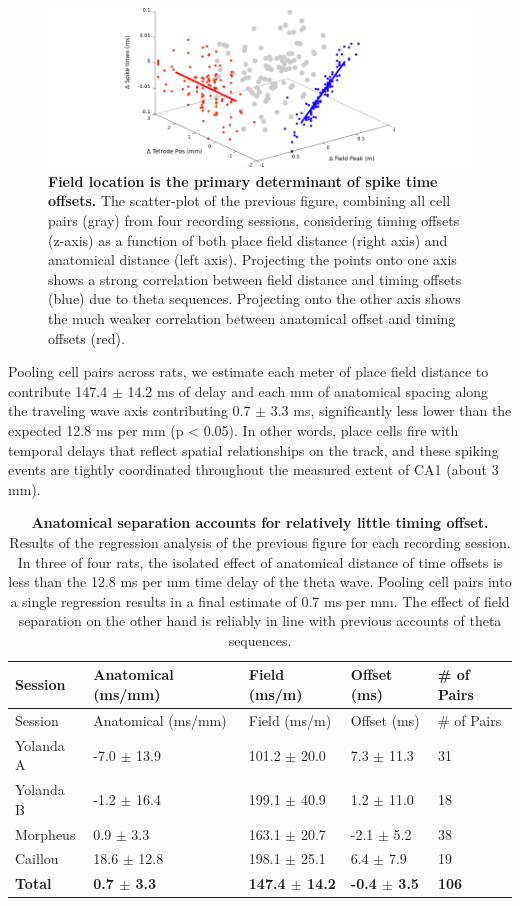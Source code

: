 \documentclass[]{article}
\begin{document}
\begin{figure}[htbp]
\centering
\includegraphics{./finalFigs/pairXcorrSummary.png}
\caption{\textbf{Field location is the primary determinant of spike time offsets.}
The scatter-plot of the previous figure, combining all cell pairs (gray)
from four recording sessions, considering timing offsets (z-axis) as a
function of both place field distance (right axis) and anatomical
distance (left axis). Projecting the points onto one axis shows a strong
correlation between field distance and timing offsets (blue) due to
theta sequences. Projecting onto the other axis shows the much weaker
correlation between anatomical offset and timing offsets (red).}
\end{figure}

Pooling cell pairs across rats, we estimate each meter of place field
distance to contribute 147.4 \(\pm\) 14.2 ms of delay and each mm of
anatomical spacing along the traveling wave axis contributing 0.7
\(\pm\) 3.3 ms, significantly less lower than the expected 12.8 ms per
mm (p \textless{} 0.05). In other words, place cells fire with temporal
delays that reflect spatial relationships on the track, and these
spiking events are tightly coordinated throughout the measured extent of
CA1 (about 3 mm).

\begin{longtable}[c]{@{}lllll@{}}
\caption{\textbf{Anatomical separation accounts for relatively little timing offset.}
Results of the regression analysis of the previous figure for each
recording session. In three of four rats, the isolated effect of
anatomical distance of time offsets is less than the 12.8 ms per mm time
delay of the theta wave. Pooling cell pairs into a single regression
results in a final estimate of 0.7 ms per mm. The effect of field
separation on the other hand is reliably in line with previous accounts
of theta sequences.}\tabularnewline
\toprule
Session & Anatomical (ms/mm) & Field (ms/m) & Offset (ms) & \# of
Pairs\tabularnewline
\midrule
\endfirsthead
\toprule
Session & Anatomical (ms/mm) & Field (ms/m) & Offset (ms) & \# of
Pairs\tabularnewline
\midrule
\endhead
Yolanda A & -7.0 \(\pm\) 13.9 & 101.2 \(\pm\) 20.0 & 7.3 \(\pm\) 11.3 &
31\tabularnewline
Yolanda B & -1.2 \(\pm\) 16.4 & 199.1 \(\pm\) 40.9 & 1.2 \(\pm\) 11.0 &
18\tabularnewline
Morpheus & 0.9 \(\pm\) 3.3 & 163.1 \(\pm\) 20.7 & -2.1 \(\pm\) 5.2 &
38\tabularnewline
Caillou & 18.6 \(\pm\) 12.8 & 198.1 \(\pm\) 25.1 & 6.4 \(\pm\) 7.9 &
19\tabularnewline
\textbf{Total} & \textbf{0.7 \(\pm\) 3.3} & \textbf{147.4 \(\pm\) 14.2}
& \textbf{-0.4 \(\pm\) 3.5} & \textbf{106}\tabularnewline
\bottomrule
\end{longtable}
\end{document}
